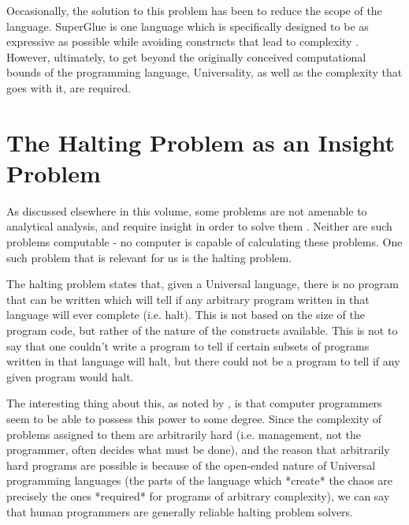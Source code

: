 Occasionally, the solution to this problem has been to reduce the scope of the language.  SuperGlue is one language which is specifically designed to be as expressive as possible while avoiding constructs that lead to complexity \citep{mcdirmid}.  However, ultimately, to get beyond the originally conceived computational bounds of the programming language, Universality, as well as the complexity that goes with it, are required.

\section{The Halting Problem as an Insight Problem}

As discussed elsewhere in this volume, some problems are not amenable to analytical analysis, and require insight in order to solve them \citep{bartlett1, holloway}.  Neither are such problems computable - no computer is capable of calculating these problems.  One such problem that is relevant for us is the halting problem.

The halting problem states that, given a Universal language, there is no program that can be written which will tell if any arbitrary program written in that language will ever complete (i.e. halt).  This is not based on the size of the program code, but rather of the nature of the constructs available.  This is not to say that one couldn't write a program to tell if certain subsets of programs written in that language will halt, but there could not be a program to tell if any given program would halt.

The interesting thing about this, as noted by \citet{bartlett1}, is that computer programmers seem to be able to possess this power to some degree.  Since the complexity of problems assigned to them are arbitrarily hard (i.e. management, not the programmer, often decides what must be done), and the reason that arbitrarily hard programs are possible is because of the open-ended nature of Universal programming languages (the parts of the language which *create* the chaos are precisely the ones *required* for programs of arbitrary complexity), we can say that human programmers are generally reliable halting problem solvers.

